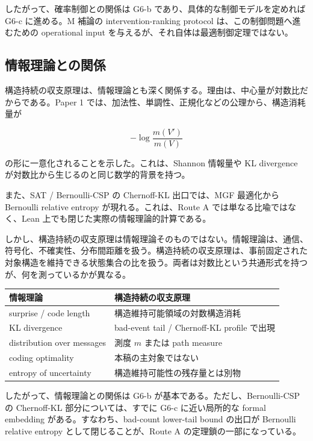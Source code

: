 \documentclass[12pt,a4paper]{article}
\begin{document}
したがって、確率制御との関係は G6-b であり、具体的な制御モデルを定めれば G6-c に進める。M 補論の intervention-ranking protocol は、この制御問題へ進むための operational input を与えるが、それ自体は最適制御定理ではない。

\subsection{情報理論との関係}\label{ux60c5ux5831ux7406ux8ad6ux3068ux306eux95a2ux4fc2}

構造持続の収支原理は、情報理論とも深く関係する。理由は、中心量が対数比だからである。Paper 1 では、加法性、単調性、正規化などの公理から、構造消耗量が

\[
-\log \frac{m(V')}{m(V)}
\]

の形に一意化されることを示した。これは、Shannon 情報量や KL divergence が対数比から生じるのと同じ数学的背景を持つ。

また、SAT / Bernoulli-CSP の Chernoff-KL 出口では、MGF 最適化から Bernoulli relative entropy が現れる。これは、Route A では単なる比喩ではなく、Lean 上でも閉じた実際の情報理論的計算である。

しかし、構造持続の収支原理は情報理論そのものではない。情報理論は、通信、符号化、不確実性、分布間距離を扱う。構造持続の収支原理は、事前固定された対象構造を維持できる状態集合の比を扱う。両者は対数比という共通形式を持つが、何を測っているかが異なる。

{\def\LTcaptype{table} %
\begin{longtable}[]{@{}ll@{}}
\toprule\noalign{}
情報理論 & 構造持続の収支原理 \\
\midrule\noalign{}
\endhead
\bottomrule\noalign{}
\endlastfoot
surprise / code length & 構造維持可能領域の対数構造消耗 \\
KL divergence & bad-event tail / Chernoff-KL profile で出現 \\
distribution over messages & 測度 \(m\) または path measure \\
coding optimality & 本稿の主対象ではない \\
entropy of uncertainty & 構造維持可能性の残存量とは別物 \\
\end{longtable}
}

したがって、情報理論との関係は G6-b が基本である。ただし、Bernoulli-CSP の Chernoff-KL 部分については、すでに G6-c に近い局所的な formal embedding がある。すなわち、bad-count lower-tail bound の出口が Bernoulli relative entropy として閉じることが、Route A の定理鎖の一部になっている。
\end{document}
